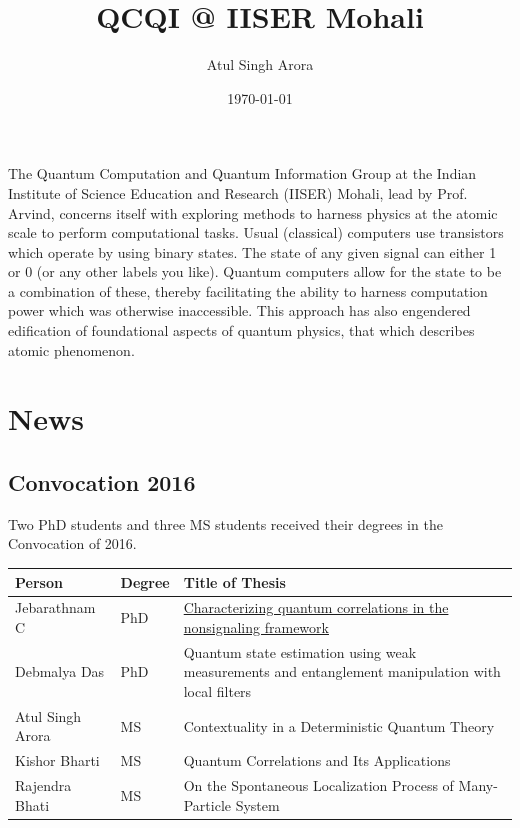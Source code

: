 \documentclass[11pt]{article}
\author{Atul Singh Arora}
\date{\today}
\title{QCQI @ IISER Mohali}
\begin{document}
\maketitle
\tableofcontents

The Quantum Computation and Quantum Information Group at the Indian Institute of Science Education and Research (IISER) Mohali, lead by Prof. Arvind, concerns itself with exploring methods to harness physics at the atomic scale to perform computational tasks. Usual (classical) computers use transistors which operate by using binary states. The state of any given signal can either 1 or 0 (or any other labels you like). Quantum computers allow for the state to be a combination of these, thereby facilitating the ability to harness computation power which was otherwise inaccessible. This approach has also engendered edification of foundational aspects of quantum physics, that which describes atomic phenomenon.

\section{News}
\label{sec-1}
\subsection{Convocation 2016}
\label{sec-1-1}
Two PhD students and three MS students received their degrees in the Convocation of 2016. 
\begin{center}
\begin{tabular}{lll}
Person & Degree & Title of Thesis\\
\hline
Jebarathnam C & PhD & \href{http://arxiv.org/abs/1605.06445}{Characterizing quantum correlations in the nonsignaling framework}\\
Debmalya Das & PhD & Quantum state estimation using weak measurements and entanglement manipulation with local filters\\
Atul Singh Arora & MS & Contextuality in a Deterministic Quantum Theory\\
Kishor Bharti & MS & Quantum Correlations and Its Applications\\
Rajendra Bhati & MS & On the Spontaneous Localization Process of Many-Particle System\\
\end{tabular}
\end{center}
\end{document}
